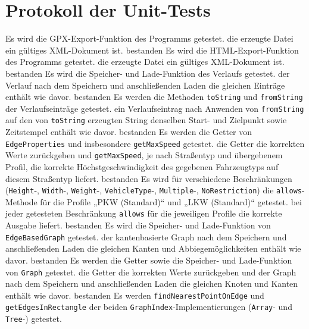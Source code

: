 \documentclass[a4paper, 11pt]{article}
\newcommand{\code}[1]{\texttt{#1}}
\begin{document}
\section{Protokoll der Unit-Tests}
\begin{itemize}
     {Es wird die GPX-Export-Funktion des Programms getestet.}
     {die erzeugte Datei ein gültiges XML-Dokument ist.}
     {bestanden}
     {Es wird die HTML-Export-Funktion des Programms getestet.}
     {die erzeugte Datei ein gültiges XML-Dokument ist.}
     {bestanden}
     {Es wird die Speicher- und Lade-Funktion des Verlaufs getestet.}
     {der Verlauf nach dem Speichern und anschließenden Laden die gleichen Einträge enthält wie davor.}
     {bestanden}
     {Es werden die Methoden \code{toString} und \code{fromString} der Verlaufseinträge getestet.}
     {ein Verlaufseintrag nach Anwenden von \code{fromString} auf den von \code{toString} erzeugten String denselben Start- und Zielpunkt sowie Zeitstempel enthält wie davor.}
     {bestanden}
     {Es werden die Getter von \code{EdgeProperties} und insbesondere \code{getMaxSpeed} getestet.}
     {die Getter die korrekten Werte zurückgeben und \code{getMaxSpeed}, je nach Straßentyp und übergebenem Profil, die korrekte Höchstgeschwindigkeit des gegebenen Fahrzeugtyps auf diesem Straßentyp liefert.}
     {bestanden}
     {Es wird für verschiedene Beschränkungen (\mbox{\code{Height}-,} \mbox{\code{Width}-,} \mbox{\code{Weight}-,} \mbox{\code{VehicleType}-,} \mbox{\code{Multiple}-,} \code{NoRestriction}) die \code{allows}-Methode für die Profile „PKW (Standard)“ und „LKW (Standard)“ getestet.}
     {bei jeder getesteten Beschränkung \code{allows} für die jeweiligen Profile die korrekte Ausgabe liefert.}
     {bestanden}
     {Es wird die Speicher- und Lade-Funktion von \code{EdgeBasedGraph} getestet.}
     {der kantenbasierte Graph nach dem Speichern und anschließenden Laden die gleichen Kanten und Abbiegemöglichkeiten enthält wie davor.}
     {bestanden}
     {Es werden die Getter sowie die Speicher- und Lade-Funktion von \code{Graph} getestet.}
     {die Getter die korrekten Werte zurückgeben und der Graph nach dem Speichern und anschließenden Laden die gleichen Knoten und Kanten enthält wie davor.}
     {bestanden}
     {Es werden \code{findNearestPointOnEdge} und \code{getEdgesInRectangle} der beiden \code{GraphIndex}-Implementierungen (\code{Array}- und \code{Tree}-) getestet.}

\end{itemize}
\end{document}
